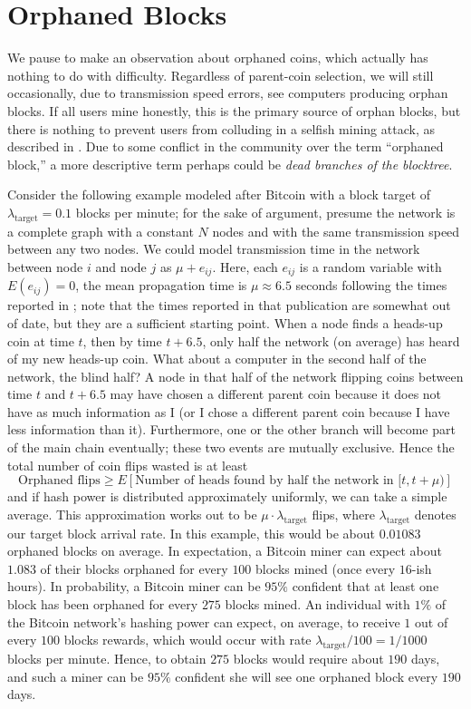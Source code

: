\documentclass[12pt,english]{mrl}
\theoremstyle{definition}
\renewcommand{\geq}{\geqslant}
\numberwithin{equation}{section}
\numberwithin{figure}{section}
\numberwithin{equation}{section}
\numberwithin{equation}{section}
\numberwithin{figure}{section}
\begin{document}
\section{Orphaned Blocks}
We pause to make an observation about orphaned coins, which actually has nothing to do with difficulty. Regardless of parent-coin selection, we will still occasionally, due to transmission speed errors, see computers producing orphan blocks. If all users mine honestly, this is the primary source of orphan blocks, but there is nothing to prevent users from colluding in a selfish mining attack, as described in \cite{eyal2014majority}. Due to some conflict in the community over the term ``orphaned block,'' a more descriptive term perhaps could be \textit{dead branches of the  blocktree}.

Consider the following example modeled after Bitcoin with a block target of $\lambda_{\text{target}}=0.1$ blocks per minute; for the sake of argument, presume the network is a complete graph with a constant $N$ nodes and with the same transmission speed between any two nodes. We could model transmission time in the network between node $i$ and node $j$ as $\mu + e_{ij}$. Here, each $e_{ij}$ is a random variable with $E(e_{ij}) = 0$, the mean propagation time is $\mu \approx 6.5$ seconds following the times reported in \cite{decker2013information}; note that the times reported in that publication are somewhat out of date, but they are a sufficient starting point. When a node finds a heads-up coin at time $t$, then by time $t+6.5$, only half the network (on average) has heard of my new heads-up coin. What about a computer in the second half of the network, the blind half? A node in that half of the network flipping coins between time $t$ and $t+6.5$ may have chosen a different parent coin because it does not have as much information as I (or I chose a different parent coin because I have less information than it). Furthermore, one or the other branch will become part of the main chain eventually; these two events are mutually exclusive. Hence the total number of coin flips wasted is at least
$$\text{Orphaned flips} \geq E\left[\text{Number of heads found by half the network in }[t,t+\mu)\right]$$
and if hash power is distributed approximately uniformly, we can take a simple average. This approximation works out to be $\mu\cdot \lambda_{\text{target}}$ flips, where $\lambda_{\text{target}}$ denotes our target block arrival rate. In this example, this would be about $0.01083$ orphaned blocks on average. In expectation, a Bitcoin miner can expect about $1.083$ of their blocks orphaned for every $100$ blocks mined (once every $16$-ish hours). In probability, a Bitcoin miner can be $95\%$ confident that at least one block has been orphaned for every $275$ blocks mined. An individual with $1\%$ of the Bitcoin network's hashing power can expect, on average, to receive $1$ out of every $100$ blocks rewards, which would occur with rate $\lambda_{\text{target}}/100 = 1/1000$ blocks per minute. Hence, to obtain $275$ blocks would require about $190$ days, and such a miner can be $95\%$ confident she will see one orphaned block every $190$ days.
\end{document}
